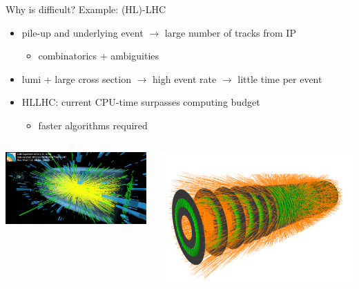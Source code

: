 \documentclass[presentation]{etp-beamer-fancy}
\begin{document}
\begin{frame}[label={sec:org244e137}]{Why is difficult? Example: (HL)-LHC}
\begin{itemize}
\item pile-up and underlying event \(\rightarrow\) large number of tracks from IP
\begin{itemize}
\item combinatorics + ambiguities
\end{itemize}
\item lumi + large cross section \(\rightarrow\) high event rate \(\rightarrow\) little time per event
\item HLLHC: current CPU-time surpasses computing budget
\begin{itemize}
\item faster algorithms required
\end{itemize}
\end{itemize}
\begin{columns}
\begin{column}{0.5\columnwidth}
\begin{center}
\includegraphics[width=.9\linewidth]{./figures/cms_heavy_ion_eventdisplay.png}
\end{center}
\end{column}
\begin{column}{0.5\columnwidth}
\begin{center}
\includegraphics[width=.9\linewidth]{./figures/trackml_generic_detector.png}
\end{center}
\end{column}
\end{columns}
\end{frame}
\end{document}
